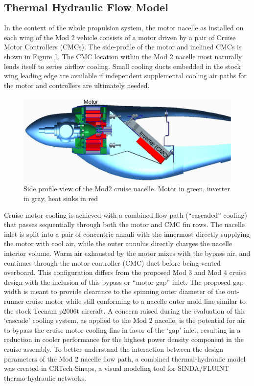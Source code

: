 \documentclass[]{aiaa-tc}%
\begin{document}
\pagebreak
\subsection{Thermal Hydraulic Flow Model}

In the context of the whole propulsion system, the motor nacelle as installed on each wing of the Mod 2 vehicle consists of a motor driven by a pair of Cruise Motor Controllers (CMCs). The side-profile of the motor and inclined CMCs is shown in Figure \ref{fig:Mod2Profile}. The CMC location within the Mod 2 nacelle most naturally lends itself to series airflow cooling. Small cooling ducts embedded in the stock wing leading edge are available if independent supplemental cooling air paths for the motor and controllers are ultimately needed.  

\begin{figure}[!h]%
	\centering
	\includegraphics[width=1.0\textwidth]{figures/mod2_profilev2.png}
	\caption{Side profile view of the Mod2 cruise nacelle. Motor in green, inverter in gray, heat sinks in red}
	\label{fig:Mod2Profile}
\end{figure}

Cruise motor cooling is achieved with a combined flow path (“cascaded” cooling) that passes sequentially through both the motor and CMC fin rows.  The nacelle inlet is split into a pair of concentric annuli with the innermost directly supplying the motor with cool air, while the outer annulus directly charges the nacelle interior volume.  Warm air exhausted by the motor mixes with the bypass air, and continues through the motor controller (CMC) duct before being vented overboard.  
This configuration differs from the proposed Mod 3 and Mod 4 cruise design with the inclusion of this bypass or “motor gap” inlet.  The proposed gap width is meant to provide clearance to the spinning outer diameter of the out-runner cruise motor while still conforming to a nacelle outer mold line similar to the stock Tecnam p2006t aircraft. 
A concern raised during the evaluation of this ‘cascade’ cooling system, as applied to the Mod 2 nacelle, is the potential for air to bypass the cruise motor cooling fins in favor of the `gap' inlet, resulting in a reduction in cooler performance for the highest power density component in the cruise assembly.  
To better understand the interaction between the design parameters of the Mod 2 nacelle flow path, a combined thermal-hydraulic model was created in CRTech Sinaps, a visual modeling tool for SINDA/FLUINT thermo-hydraulic networks. \cite{CRtech_2015}
\end{document}
